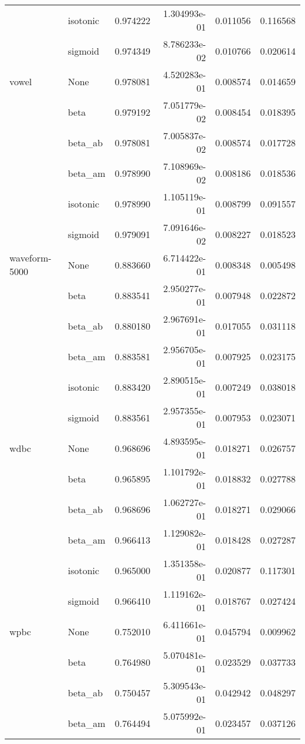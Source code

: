 \begin{tabular}{llrrrr}
        & isotonic &  0.974222 &  1.304993e-01 &  0.011056 &  0.116568 \\
        & sigmoid &  0.974349 &  8.786233e-02 &  0.010766 &  0.020614 \\
vowel & None &  0.978081 &  4.520283e-01 &  0.008574 &  0.014659 \\
        & beta &  0.979192 &  7.051779e-02 &  0.008454 &  0.018395 \\
        & beta\_ab &  0.978081 &  7.005837e-02 &  0.008574 &  0.017728 \\
        & beta\_am &  0.978990 &  7.108969e-02 &  0.008186 &  0.018536 \\
        & isotonic &  0.978990 &  1.105119e-01 &  0.008799 &  0.091557 \\
        & sigmoid &  0.979091 &  7.091646e-02 &  0.008227 &  0.018523 \\
waveform-5000 & None &  0.883660 &  6.714422e-01 &  0.008348 &  0.005498 \\
        & beta &  0.883541 &  2.950277e-01 &  0.007948 &  0.022872 \\
        & beta\_ab &  0.880180 &  2.967691e-01 &  0.017055 &  0.031118 \\
        & beta\_am &  0.883581 &  2.956705e-01 &  0.007925 &  0.023175 \\
        & isotonic &  0.883420 &  2.890515e-01 &  0.007249 &  0.038018 \\
        & sigmoid &  0.883561 &  2.957355e-01 &  0.007953 &  0.023071 \\
wdbc & None &  0.968696 &  4.893595e-01 &  0.018271 &  0.026757 \\
        & beta &  0.965895 &  1.101792e-01 &  0.018832 &  0.027788 \\
        & beta\_ab &  0.968696 &  1.062727e-01 &  0.018271 &  0.029066 \\
        & beta\_am &  0.966413 &  1.129082e-01 &  0.018428 &  0.027287 \\
        & isotonic &  0.965000 &  1.351358e-01 &  0.020877 &  0.117301 \\
        & sigmoid &  0.966410 &  1.119162e-01 &  0.018767 &  0.027424 \\
wpbc & None &  0.752010 &  6.411661e-01 &  0.045794 &  0.009962 \\
        & beta &  0.764980 &  5.070481e-01 &  0.023529 &  0.037733 \\
        & beta\_ab &  0.750457 &  5.309543e-01 &  0.042942 &  0.048297 \\
        & beta\_am &  0.764494 &  5.075992e-01 &  0.023457 &  0.037126 \\

\end{tabular}
